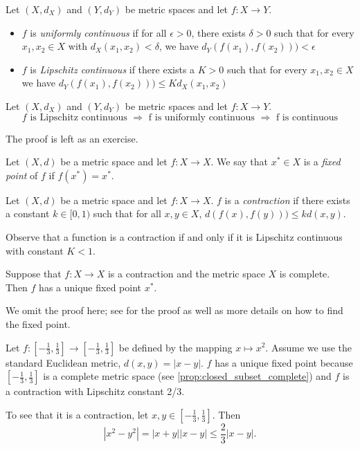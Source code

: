 \documentclass{article}
\begin{document}
\begin{definition}
\label{def:Lip_unif}
Let $(X,d_X)$ and $(Y,d_Y)$ be metric spaces and let $f:X\to Y$. 
\begin{itemize}
    \item $f$ is \emph{uniformly continuous} if for all $\epsilon>0$, there exists $\delta > 0$ such that for every $x_1,x_2\in X$ with $d_X(x_1,x_2) < \delta$, we have  $d_Y(f(x_1),f(x_2))) < \epsilon$ 
    \item $f$ is \emph{Lipschitz continuous} if there exists a $K > 0$ such that for every $x_1,x_2\in X$ we have  $d_Y(f(x_1),f(x_2))) \leq K d_X(x_1,x_2)$
\end{itemize}
\end{definition}

\begin{proposition}
Let $(X,d_X)$ and $(Y,d_Y)$ be metric spaces and let $f:X\to Y$. 
$$f \text{ is Lipschitz continuous } \Rightarrow \text{ f is uniformly continuous } \Rightarrow \text{ f is continuous}$$
\end{proposition}

The proof is left as an exercise. 

\begin{definition}
Let $(X,d)$ be a metric space and let $f:X \to X$. We say that $x^* \in X$ is a \emph{fixed point} of $f$ if $f(x^*) = x^*$.
\end{definition}

\begin{definition}
Let $(X,d)$ be a metric space and let $f:X \to X$. $f$ is a \emph{contraction} if there exists a constant $k \in [0,1)$ such that for all $x,y \in X$, $d(f(x),f(y))) \leq k d(x,y)$.
\end{definition}

Observe that a function is a contraction if and only if it is Lipschitz continuous with constant $K < 1$.

\begin{theorem}
Suppose that $f : X \to X$ is a contraction and the metric space $X$ is complete. Then $f$ has a unique fixed point $x^*$.
\end{theorem}

We omit the proof here; see \cite[p.240]{realanalysis} for the proof as well as more details on how to find the fixed point.

\begin{example}
Let $f:\left[-\frac{1}{3},\frac{1}{3}\right] \to \left[-\frac{1}{3},\frac{1}{3}\right]$ be defined by the mapping $x \mapsto x^2$. Assume we use the standard Euclidean metric, $d(x,y) = |x-y|$. $f$ has a unique fixed point because $\left[-\frac{1}{3},\frac{1}{3}\right]$ is a complete metric space (see \cref{prop:closed_subset_complete}) and $f$ is a contraction with Lipschitz constant 2/3.

To see that it is a contraction, let $x,y \in \left[-\frac{1}{3},\frac{1}{3}\right]$. Then
\begin{equation*}
   |x^2 - y^2| = |x+y| |x-y| \leq \frac{2}{3} |x-y|. 
\end{equation*}
\end{example}
\end{document}
